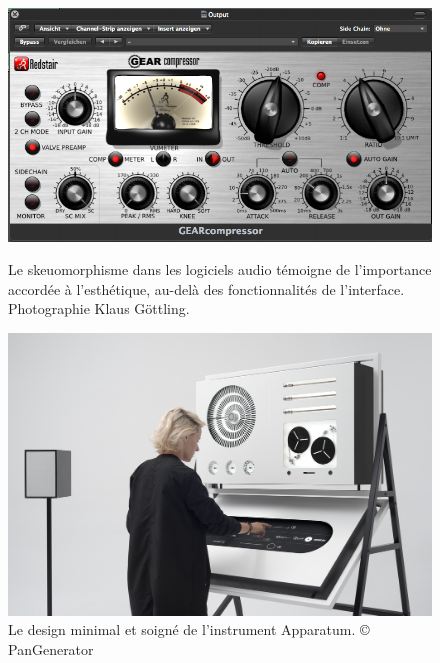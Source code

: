 \begin{figure}[!htbp]
	\captionsetup{format=plain}%
	\centering
	\begin{minipage}[t]{0.48\textwidth}
		\includegraphics[width=\linewidth]{gfx/06_visual_representation/Redstair_GEARcompressor.png}
		\caption[Skeuomorphisme dans les logiciels audio]{Le skeuomorphisme dans les logiciels audio témoigne de l'importance accordée à l'esthétique, au-delà des fonctionnalités de l'interface. Photographie Klaus Göttling.}
		\label{fig:visual_representation:skeuomorphisme}
	\end{minipage}
	\hspace{.02\linewidth}
	\begin{minipage}[t]{0.48\textwidth}
	    \includegraphics[width=\linewidth]{gfx/06_visual_representation/2018_06_26_PAN_GENERATOR_APPARATUM0396.jpg}
		\caption[Apparatum, par PanGenerator]{Le design minimal et soigné de l'instrument Apparatum. © PanGenerator}
		\label{fig:visual_representation:apparatum}
	\end{minipage}
\end{figure}



